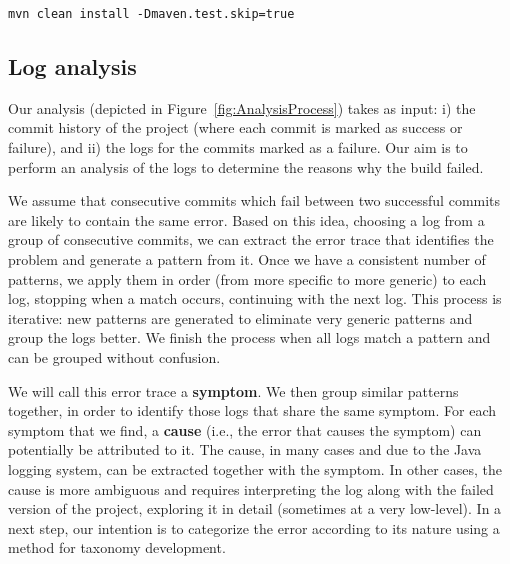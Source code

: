 

\begin{lstlisting}[caption={Example of a Maven build command},captionpos=b, label={listing:mvnscrpt}]
                      mvn clean install -Dmaven.test.skip=true
\end{lstlisting}


\subsection{Log analysis} 
\label{sssec:logAnalysis}

Our analysis (depicted in Figure~\ref{fig:AnalysisProcess}) takes as input:
   i) the commit history of the project (where each commit is marked as success or failure), and
   ii) the logs for the commits marked as a failure.
Our aim is to perform an analysis of the logs to determine the reasons why the build failed.


We assume that consecutive commits which fail between two successful commits are likely to contain the same error.
Based on this idea, choosing a log from a group of consecutive commits, we can extract the error trace that identifies the problem and generate a pattern from it.
Once we have a consistent number of patterns, we apply them in order (from more specific to more generic) to each log, stopping when a match occurs, continuing with the next log.
This process is iterative: new patterns are generated to eliminate very generic patterns and group the logs better.
We finish the process when all logs match a pattern and can be grouped without confusion.

We will call this error trace a \textbf{symptom}.
We then group similar patterns together, in order to identify those logs that share the same symptom.
For each symptom that we find, a \textbf{cause} (i.e., the error that causes the symptom) can potentially be attributed to it.
The cause, in many cases and due to the Java logging system, can be extracted together with the symptom.
In other cases, the cause is more ambiguous and requires interpreting the log along with the failed version of the project, exploring it in detail (sometimes at a very low-level).
In a next step, our intention is to categorize the error according to its nature using a method for taxonomy development.

